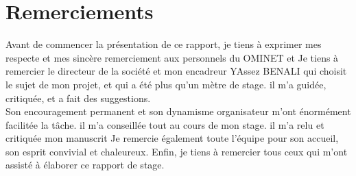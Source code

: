 
\chapter*{Remerciements}

Avant de commencer la présentation de ce rapport, je tiens à exprimer mes respecte et mes sincère remerciement aux personnels du OMINET et Je tiens à remercier le directeur de la société et mon encadreur YAssez BENALI qui choisit le sujet de mon projet, et qui a été plus qu’un mètre de stage. il m’a guidée, critiquée, et a fait des suggestions.\\
Son encouragement permanent et son dynamisme organisateur m’ont énormément facilitée la tâche. il m’a conseillée tout au cours de mon stage. il m’a relu et critiquée mon manuscrit
Je remercie également toute l'équipe pour son accueil, son esprit convivial et chaleureux.
   Enfin, je tiens à remercier tous ceux qui m’ont assisté à élaborer ce rapport de stage.
